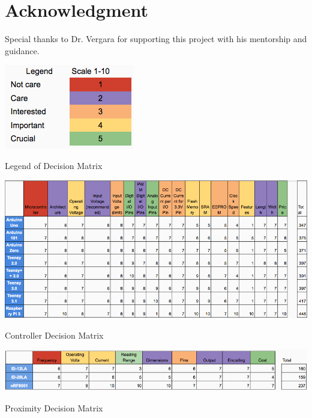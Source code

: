\documentclass[12pt]{article}
\begin{document}
\section*{Acknowledgment}

Special thanks to Dr. Vergara for supporting this project with his mentorship and guidance.

\newpage

{}

\newpage
\begin{appendix}

  \listoffigures
  \listoftables

  \begin{table}[!htb]
    \begin{center}
      \includegraphics[scale=1]{Figures/DecisionMatrixLegend}
    \end{center}
    \caption{Legend of Decision Matrix}
    \label{tabl:DecLegend}
  \end{table}

  \begin{table}[!htb]
    \includegraphics[width=\textwidth]{Figures/DecisionMatrixController}
    \caption{Controller Decision Matrix}
     \label{tabl:DecController}
  \end{table}

  \begin{table}[!htb]
    \includegraphics[width=\textwidth]{Figures/DecisionMatrixProximity}
    \caption{Proximity Decision Matrix}
     \label{tabl:DecProximity}
  \end{table}


\end{appendix}
\end{document}
